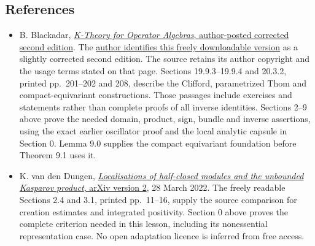 \documentclass[
  11pt,
]{article}
\begin{document}
\subsection{References}\label{references}

\begin{itemize}
\item
  B. Blackadar,
  \href{https://www.bruceblackadar.com/Mathematics/book6.pdf}{\emph{K-Theory
  for Operator Algebras}, author-posted corrected second edition}. The
  \href{https://www.bruceblackadar.com/mathpubs.html}{author identifies
  this freely downloadable version} as a slightly corrected second
  edition. The source retains its author copyright and the usage terms
  stated on that page. Sections 19.9.3--19.9.4 and 20.3.2, printed
  pp.~201--202 and 208, describe the Clifford, parametrized Thom and
  compact-equivariant constructions. Those passages include exercises
  and statements rather than complete proofs of all inverse identities.
  Sections 2--9 above prove the needed domain, product, sign, bundle and
  inverse assertions, using the exact earlier oscillator proof and the
  local analytic capsule in Section 0. Lemma 9.0 supplies the compact
  equivariant foundation before Theorem 9.1 uses it.
\item
  K. van den Dungen,
  \href{https://arxiv.org/pdf/2006.10616v2}{\emph{Localisations of
  half-closed modules and the unbounded Kasparov product}, arXiv version
  2}, 28 March 2022. The freely readable Sections 2.4 and 3.1, printed
  pp.~11--16, supply the source comparison for creation estimates and
  integrated positivity. Section 0 above proves the complete criterion
  needed in this lesson, including its nonessential representation case.
  No open adaptation licence is inferred from free access.
\end{itemize}
\end{document}
